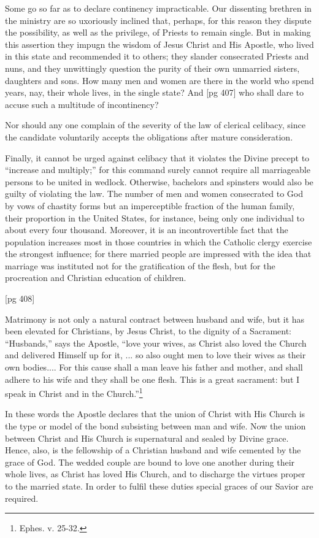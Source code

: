 Some go so far as to declare continency impracticable.
Our dissenting brethren in the ministry
are so uxoriously inclined that, perhaps, for this
reason they dispute the possibility, as well as the
privilege, of Priests to remain single. But in
making this assertion they impugn the wisdom
of Jesus Christ and His Apostle, who lived in this
state and recommended it to others; they slander
consecrated Priests and nuns, and they unwittingly
question the purity of their own unmarried
sisters, daughters and sons. How many men and
women are there in the world who spend years,
nay, their whole lives, in the single state? And
[pg 407]
who shall dare to accuse such a multitude of incontinency?

Nor should any one complain of the severity of
the law of clerical celibacy, since the candidate voluntarily
accepts the obligations after mature consideration.

Finally, it cannot be urged against celibacy that
it violates the Divine precept to “increase and
multiply;” for this command surely cannot require
all marriageable persons to be united in wedlock.
Otherwise, bachelors and spinsters would
also be guilty of violating the law. The number
of men and women consecrated to God by vows of
chastity forms but an imperceptible fraction of the
human family, their proportion in the United
States, for instance, being only one individual to
about every four thousand. Moreover, it is an
incontrovertible fact that the population increases
most in those countries in which the Catholic
clergy exercise the strongest influence; for there
married people are impressed with the idea that
marriage was instituted not for the gratification of
the flesh, but for the procreation and Christian
education of children.

[pg 408]


Matrimony is not only a natural contract
between husband and wife, but it has been
elevated for Christians, by Jesus Christ,
to the dignity of a Sacrament: “Husbands,” says
the Apostle, “love your wives, as Christ also
loved the Church and delivered Himself up for it, ...
so also ought men to love their wives as their
own bodies.... For this cause shall a man leave
his father and mother, and shall adhere to his
wife and they shall be one flesh. This is a great
sacrament: but I speak in Christ and in the
Church.”\footnote{Ephes. v. 25-32.}

In these words the Apostle declares that the
union of Christ with His Church is the type or
model of the bond subsisting between man and
wife. Now the union between Christ and His
Church is supernatural and sealed by Divine
grace. Hence, also, is the fellowship of a Christian
husband and wife cemented by the grace of
God. The wedded couple are bound to love one
another during their whole lives, as Christ has
loved His Church, and to discharge the virtues
proper to the married state. In order to fulfil
these duties special graces of our Savior are required.

